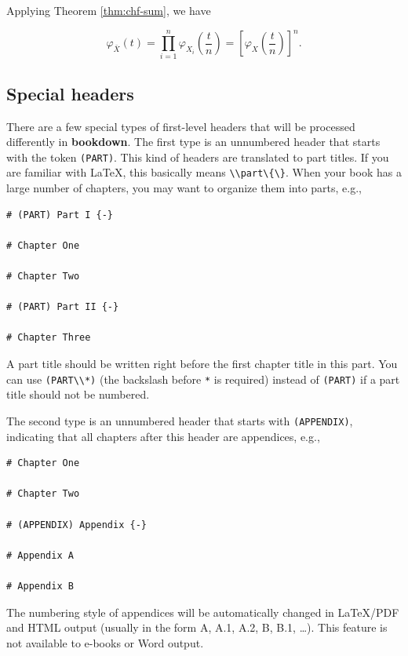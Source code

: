 \documentclass[doctor,openright,twoside]{sjtuthesis}
\newcommand{\passthrough}[1]{#1}
\theoremstyle{plain}
\theoremstyle{definition}
\theoremstyle{remark}
\theoremstyle{ocrenumbox}
\theoremstyle{plain}
\let\BeginKnitrBlock\begin \let\EndKnitrBlock\end
\begin{document}
\BeginKnitrBlock{solution}
{}Applying Theorem \ref{thm:chf-sum}, we have

\[\varphi _{\bar{X}}(t)=\prod_{i=1}^n \varphi _{X_i}\left(\frac{t}{n}\right)=\left[\varphi _{X}\left(\frac{t}{n}\right)\right]^n.\]
\EndKnitrBlock{solution}

\hypertarget{special-headers}{%
\subsection{Special headers}\label{special-headers}}

There are a few special types of first-level headers that will be
processed differently in \textbf{bookdown}. The first type is an
unnumbered header that starts with the token
\passthrough{\lstinline!(PART)!}. This kind of headers are translated to
part titles. If you are familiar with LaTeX, this basically
means \passthrough{\lstinline!\\part\{\}!}. When your book has a large
number of chapters, you may want to organize them into parts, e.g.,

\begin{lstlisting}
# (PART) Part I {-} 

# Chapter One

# Chapter Two

# (PART) Part II {-} 

# Chapter Three
\end{lstlisting}

A part title should be written right before the first chapter title in
this part. You can use \passthrough{\lstinline!(PART\\*)!} (the
backslash before \passthrough{\lstinline!*!} is required) instead of
\passthrough{\lstinline!(PART)!} if a part title should not be numbered.

The second type is an unnumbered header that starts with
\passthrough{\lstinline!(APPENDIX)!}, indicating that all chapters after
this header are appendices, e.g.,

\begin{lstlisting}
# Chapter One 

# Chapter Two

# (APPENDIX) Appendix {-} 

# Appendix A

# Appendix B
\end{lstlisting}

The numbering style of appendices will be automatically changed in
LaTeX/PDF and HTML output (usually in the form A, A.1, A.2, B, B.1,
\ldots{}). This feature is not available to e-books or Word output.
\end{document}
